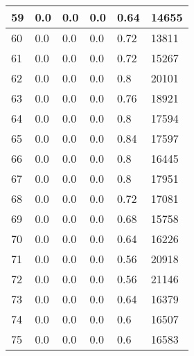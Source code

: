 \begin{longtable}{|l|l|l|l|l|l|}
59 & 0.0 & 0.0 & 0.0 & 0.64 & 14655 \\ \hline 
60 & 0.0 & 0.0 & 0.0 & 0.72 & 13811 \\ \hline 
61 & 0.0 & 0.0 & 0.0 & 0.72 & 15267 \\ \hline 
62 & 0.0 & 0.0 & 0.0 & 0.8 & 20101 \\ \hline 
63 & 0.0 & 0.0 & 0.0 & 0.76 & 18921 \\ \hline 
64 & 0.0 & 0.0 & 0.0 & 0.8 & 17594 \\ \hline 
65 & 0.0 & 0.0 & 0.0 & 0.84 & 17597 \\ \hline 
66 & 0.0 & 0.0 & 0.0 & 0.8 & 16445 \\ \hline 
67 & 0.0 & 0.0 & 0.0 & 0.8 & 17951 \\ \hline 
68 & 0.0 & 0.0 & 0.0 & 0.72 & 17081 \\ \hline 
69 & 0.0 & 0.0 & 0.0 & 0.68 & 15758 \\ \hline 
70 & 0.0 & 0.0 & 0.0 & 0.64 & 16226 \\ \hline 
71 & 0.0 & 0.0 & 0.0 & 0.56 & 20918 \\ \hline 
72 & 0.0 & 0.0 & 0.0 & 0.56 & 21146 \\ \hline 
73 & 0.0 & 0.0 & 0.0 & 0.64 & 16379 \\ \hline 
74 & 0.0 & 0.0 & 0.0 & 0.6 & 16507 \\ \hline 
75 & 0.0 & 0.0 & 0.0 & 0.6 & 16583 \\ \hline 
\end{longtable}